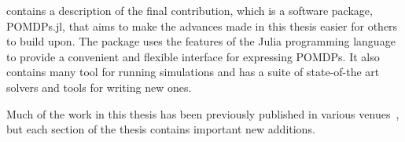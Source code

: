  contains a description of the final contribution, which is a software package, POMDPs.jl, that aims to make the advances made in this thesis easier for others to build upon.
The package uses the features of the Julia programming language to provide a convenient and flexible interface for expressing POMDPs.
It also contains many tool for running simulations and has a suite of state-of-the art solvers and tools for writing new ones.

Much of the work in this thesis has been previously published in various venues~\cite{sunberg2017value,sunberg2018pomcpow,ZS-MK-MP:16,egorov2017pomdps}, but each section of the thesis contains important new additions.
